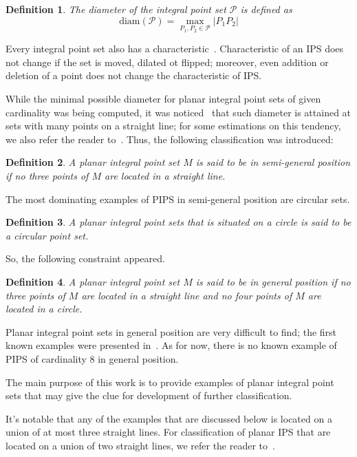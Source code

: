 \documentclass[12pt]{article}
\theoremstyle{theorem}
\theoremstyle{dfn}
\newtheorem{dfn}{Definition}
\theoremstyle{remark}
\begin{document}
\begin{dfn}
	The diameter of the integral point set $\mathcal{P}$ is defined as
	\begin{equation}
		\operatorname{diam(\mathcal{P})} = \underset{P_{1}, P_{2} \in
		\mathcal{P}}{\max} |P_{1}P_{2}|
	\end{equation}
\end{dfn}

Every integral point set also has a characteristic~\cite{kemnitz1988punktmengen,kurz2005characteristic}.
Characteristic of an IPS does not change if the set is moved, dilated ot flipped;
moreover, even addition or deletion of a point does not change the characteristic of IPS.


While the minimal possible diameter for planar integral point sets of given cardinality was being computed,
it was noticed~\cite{kurz2008minimum} that such diameter is attained at sets with many points on a straight line;
for some estimations on this tendency, we also refer the reader to~\cite{solymosi2003note}.
Thus, the following classification was introduced:
\begin{dfn}
	A planar integral point set $M$ is said to be in \emph{semi-general position}
	if no three points of $M$ are located in a straight line.
\end{dfn}

The most dominating examples of PIPS in semi-general position are circular sets.
\begin{dfn}
	A planar integral point sets that is situated on a circle is said to be a \textit{circular}
	point set.
\end{dfn}

So, the following constraint appeared.
\begin{dfn}
	A planar integral point set $M$ is said to be in \emph{general position}
	if no three points of $M$ are located in a straight line
	and no four points of $M$ are located in a circle.
\end{dfn}

Planar integral point sets in general position are very difficult to find;
the first known examples were presented in~\cite{kreisel2008heptagon}.
As for now, there is no known example of PIPS of cardinality 8 in general position.

The main purpose of this work is to provide examples of planar integral point sets
that may give the clue for development of further classification.

It's notable that any of the examples that are discussed below
is located on a union of at most three straight lines.
For classification of planar IPS that are located on a union of two straight lines,
we refer the reader to~\cite{avdeev2019particular}.
\end{document}
